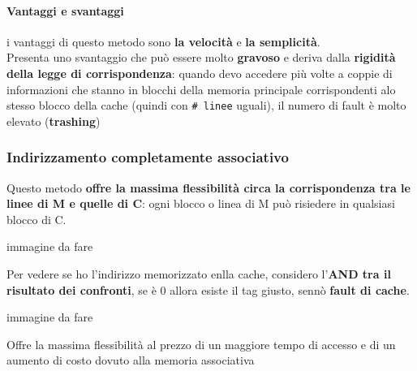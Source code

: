 \documentclass[10pt]{report}
\begin{document}
\paragraph{Vantaggi e svantaggi} i vantaggi di questo metodo sono \textbf{la velocità} e \textbf{la semplicità}.\\
Presenta uno svantaggio che può essere molto \textbf{gravoso} e deriva dalla \textbf{rigidità della legge di corrispondenza}: quando devo accedere più volte a coppie di informazioni che stanno in blocchi della memoria principale corrispondenti alo stesso blocco della cache (quindi con \texttt{\# linee} uguali), il numero di fault è molto elevato (\textbf{trashing})
\subsubsection{Indirizzamento completamente associativo}
Questo metodo \textbf{offre la massima flessibilità circa la corrispondenza tra le linee di M e quelle di C}: ogni blocco o linea di M può risiedere in qualsiasi blocco di C.
\begin{multicols}{2}
\begin{center}
immagine da fare
\end{center}
\columnbreak
Per vedere se ho l'indirizzo memorizzato enlla cache, considero l'\textbf{AND tra il risultato dei confronti}, se è 0 allora esiste il tag giusto, sennò \textbf{fault di cache}.
\end{multicols}
\begin{center}
immagine da fare
\end{center}
Offre la massima flessibilità al prezzo di un maggiore tempo di accesso e di un aumento di costo dovuto alla memoria associativa
\end{document}
